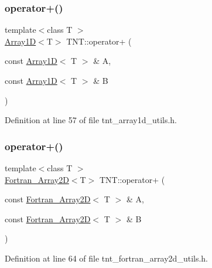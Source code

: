 \subsubsection{\texorpdfstring{operator+()}{operator+()}\hspace{0.1cm}{\footnotesize\ttfamily [2/7]}}
{\footnotesize\ttfamily template$<$class T $>$ \\
\hyperlink{classTNT_1_1Array1D}{Array1D}$<$T$>$ T\+N\+T\+::operator+ (\begin{DoxyParamCaption}\item[{const \hyperlink{classTNT_1_1Array1D}{Array1D}$<$ T $>$ \&}]{A,  }\item[{const \hyperlink{classTNT_1_1Array1D}{Array1D}$<$ T $>$ \&}]{B }\end{DoxyParamCaption})}



Definition at line 57 of file tnt\+\_\+array1d\+\_\+utils.\+h.

\mbox{\label{namespaceTNT_a3838bc6cf71174487152b0bbebf2fa9a}} 
\subsubsection{\texorpdfstring{operator+()}{operator+()}\hspace{0.1cm}{\footnotesize\ttfamily [3/7]}}
{\footnotesize\ttfamily template$<$class T $>$ \\
\hyperlink{classTNT_1_1Fortran__Array2D}{Fortran\+\_\+\+Array2D}$<$T$>$ T\+N\+T\+::operator+ (\begin{DoxyParamCaption}\item[{const \hyperlink{classTNT_1_1Fortran__Array2D}{Fortran\+\_\+\+Array2D}$<$ T $>$ \&}]{A,  }\item[{const \hyperlink{classTNT_1_1Fortran__Array2D}{Fortran\+\_\+\+Array2D}$<$ T $>$ \&}]{B }\end{DoxyParamCaption})}



Definition at line 64 of file tnt\+\_\+fortran\+\_\+array2d\+\_\+utils.\+h.

\mbox{\label{namespaceTNT_a410445519880e60d6110b1678e701b20}} 
